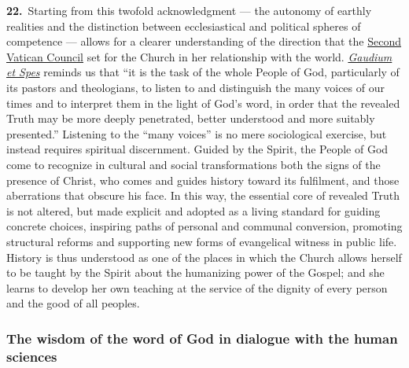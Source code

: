 \documentclass{article}
\begin{document}
\textbf{22.}\ Starting from this twofold acknowledgment --- the autonomy of earthly realities and the distinction between ecclesiastical and political spheres of competence --- allows for a clearer understanding of the direction that the \href{https://www.vatican.va/archive/hist_councils/ii_vatican_council/index.htm}{Second Vatican Council} set for the Church in her relationship with the world. \href{https://www.vatican.va/archive/hist_councils/ii_vatican_council/documents/vat-ii_const_19651207_gaudium-et-spes_en.html}{\emph{Gaudium et Spes}} reminds us that ``it is the task of the whole People of God, particularly of its pastors and theologians, to listen to and distinguish the many voices of our times and to interpret them in the light of God's word, in order that the revealed Truth may be more deeply penetrated, better understood and more suitably presented.''\cite{n11} Listening to the ``many voices'' is no mere sociological exercise, but instead requires spiritual discernment. Guided by the Spirit, the People of God come to recognize in cultural and social transformations both the signs of the presence of Christ, who comes and guides history toward its fulfilment, and those aberrations that obscure his face. In this way, the essential core of revealed Truth is not altered, but made explicit and adopted as a living standard for guiding concrete choices, inspiring paths of personal and communal conversion, promoting structural reforms and supporting new forms of evangelical witness in public life. History is thus understood as one of the places in which the Church allows herself to be taught by the Spirit about the humanizing power of the Gospel; and she learns to develop her own teaching at the service of the dignity of every person and the good of all peoples.

\subsubsection{The wisdom of the word of God in dialogue with the human sciences}
\end{document}
